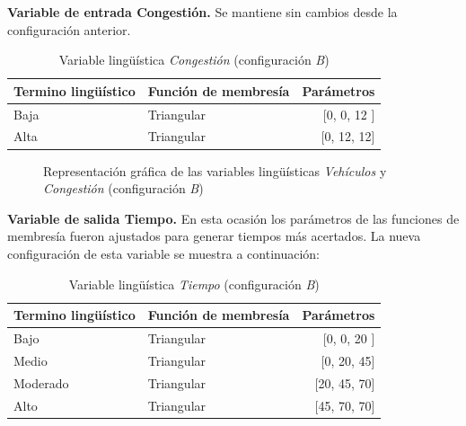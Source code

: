 \textbf{Variable de entrada Congestión.} Se mantiene sin cambios desde la configuración anterior.\\


\begin{table}[!h]
	\centering
	\begin{tabular}{llr} \toprule
		Termino lingüístico & Función de membresía & Parámetros \\ \midrule
		Baja & Triangular & [0, 0, 12 ] \\
		Alta & Triangular & [0, 12, 12] \\ \bottomrule
	\end{tabular}
	\caption{Variable lingüística \textit{Congestión} (configuración \textit{B})}
\end{table}

\begin{figure}[H]
	\centering
	\caption{Representación gráfica de las variables lingüísticas \textit{Vehículos} y \textit{Congestión} (configuración \textit{B})}
\end{figure}

\pagebreak
\textbf{Variable de salida Tiempo.}
En esta ocasión los parámetros de las funciones de membresía fueron ajustados para generar tiempos más acertados. La nueva configuración de esta variable se muestra a continuación:

\begin{table}[!h]
	\centering
	\begin{tabular}{llr} \toprule
		Termino lingüístico & Función de membresía & Parámetros \\ \midrule
		Bajo & Triangular & [0, 0, 20 ] \\
		Medio & Triangular & [0, 20, 45] \\
		Moderado & Triangular & [20, 45, 70] \\
		Alto & Triangular & [45, 70, 70] \\ \bottomrule
	\end{tabular}
	\caption{Variable lingüística \textit{Tiempo} (configuración \textit{B})}
\end{table}

